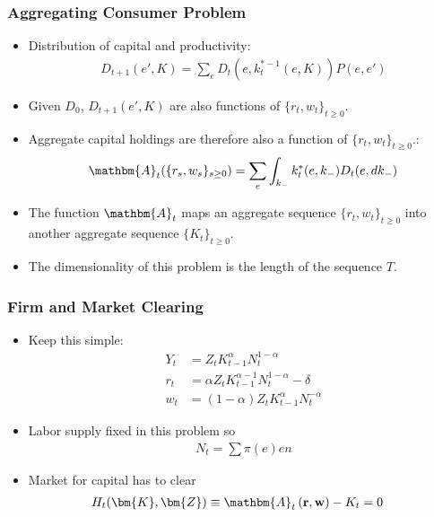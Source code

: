 \documentclass[english,xcolor=svgnames]{beamer}
\begin{document}
\begin{frame}
    \frametitle{Aggregating Consumer Problem}
    \begin{itemize}
        \item Distribution of capital and productivity:
        \begin{align*}
        	D_{t+1}(e',K) = \sum_e D_t(e,k_t^{*-1}(e,K))P(e,e')
        \end{align*}
        \item Given $D_0$, $D_{t+1}(e',K)$ are also functions of $\{r_t,w_t\}_{t\ge 0 }$.
        \item Aggregate capital holdings are therefore also a function of $\{r_t,w_t\}_{t\ge 0 }$.:
        \begin{align*}
        	\mathbm{A}_t(\{r_s,w_s\}_{s\ge 0 }) = \sum_e \int_{k_{-}} k_t^*(e,k_{-}) D_t(e,dk_{-})
        \end{align*}
        \item The function $\mathbm{A}_t$ maps an aggregate sequence $\{r_t,w_t\}_{t\ge 0 }$ into another aggregate sequence $\{K_t\}_{t\ge 0}$.
        \item The dimensionality of this problem is the length of the sequence $T$.
	\end{itemize}
\end{frame}


\begin{frame}
    \frametitle{Firm and Market Clearing}
    \begin{itemize}
        \item Keep this simple:
        \begin{align*}
        	Y_t &= Z_t K_{t-1}^{\alpha} N_t^{1-\alpha} \\
        	 r_t &= \alpha  Z_t K_{t-1}^{\alpha-1} N_t^{1-\alpha} - \delta \\
        	 w_t &= (1-\alpha) Z_t K_{t-1}^{\alpha} N_t^{-\alpha}
        \end{align*}
        \item Labor supply fixed in this problem so
        \begin{align*}
        	N_t = \sum \pi(e) en
        \end{align*}
        \item Market for capital has to clear
        \begin{align*}
        	&H_t(\bm{K},\bm{Z})  \equiv \mathbm{A}_t\left( \mathbf{r}, \mathbf{w} \right)   - K_t = 0
        \end{align*}
	\end{itemize}
\end{frame}
\end{document}

